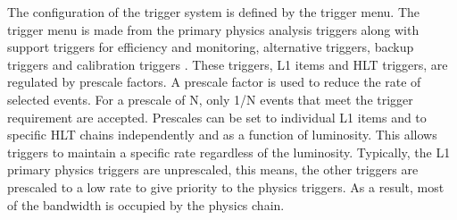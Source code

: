 \indent The configuration of the trigger system is defined by the trigger menu. The trigger menu is made from the primary physics analysis triggers along with support triggers for efficiency and monitoring, alternative triggers, backup triggers and calibration triggers \cite{zurNedden:2238679}. These triggers, L1 items and HLT triggers, are regulated by prescale factors. A prescale factor is used to reduce the rate of selected events. For a prescale of N, only 1/N events that meet the trigger requirement are accepted. Prescales can be set to individual L1 items and to specific HLT chains independently and as a function of luminosity. This allows triggers to maintain a specific rate regardless of the luminosity. Typically, the L1 primary physics triggers are unprescaled, this means, the other triggers are prescaled to a low rate to give priority to the physics triggers. As a result, most of the bandwidth is occupied by the physics chain. \linebreak


